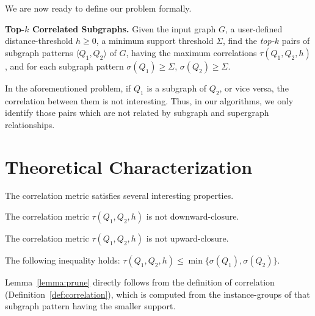 We are now ready to define our problem formally.

\begin{problem}
\label{prob:top-k}
{\bf {\sf Top-$k$} Correlated Subgraphs.}
Given the input graph $G$, a user-defined distance-threshold $h\ge0$, a minimum support threshold $\Sigma$, find the {\em top-$k$} pairs of subgraph patterns $\langle Q_1, Q_2 \rangle$ of $G$, having the
maximum correlations $\tau(Q_1,Q_2,h)$, and for each subgraph pattern $\sigma(Q_1)\ge \Sigma$, $\sigma(Q_2)\ge \Sigma$.
\end{problem}

In the aforementioned problem, if $Q_1$ is a subgraph of $Q_2$, or vice versa, the correlation between them is not interesting.
Thus, in our algorithms, we only identify those pairs which are not related by subgraph and supergraph relationships.


\section{Theoretical Characterization}
\label{sec:characteristics}
 
The correlation metric satisfies several interesting properties.

\begin{lma}
\label{lemma:downward}
The correlation metric $\tau(Q_1,Q_2,h)$ is not downward-closure.
\end{lma}

\begin{lma}
\label{lemma:upward}
The correlation metric $\tau(Q_1,Q_2,h)$ is not upward-closure.
\end{lma}

\begin{lma}
\label{lemma:prune}
The following inequality holds: $\tau(Q_1,Q_2,h) \le \min \{\sigma(Q_1),\sigma(Q_2)\}$.
\end{lma}

Lemma~\ref{lemma:prune} directly follows from the definition of correlation (Definition~\ref{def:correlation}), which is computed
from the instance-groups of that subgraph pattern having the smaller support.